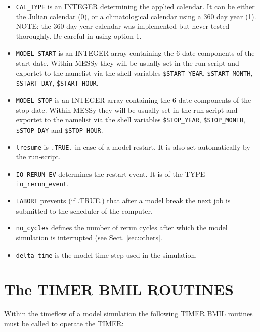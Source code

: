 \documentclass[twoside]{article}
\begin{document}
\begin{itemize}
\item \verb|CAL_TYPE| is an {\footnotesize INTEGER} determining the applied
      calendar.
      It can be either the Julian calendar (0), or a climatological calendar
      using a 360 day year (1). NOTE: the 360 day year calendar was implemented
      but never tested thoroughly. Be careful in using option 1. 
\item \verb|MODEL_START| is an {\footnotesize INTEGER} array containing the 6 date
      components of the start date. Within MESSy they will be usually set in
      the run-script and exportet to the namelist via the shell variables
      \verb|$START_YEAR|, \verb|$START_MONTH|, \verb|$START_DAY|,
      \verb|$START_HOUR|.
\item \verb|MODEL_STOP| is an {\footnotesize INTEGER} array containing the 6 date
      components of the stop date. Within MESSy they will be usually set in
      the run-script and exportet to the namelist via the shell variables
      \verb|$STOP_YEAR|, \verb|$STOP_MONTH|, \verb|$STOP_DAY| and
      \verb|$STOP_HOUR|.
\item \verb|lresume| is \verb|.TRUE.| in case of a model restart. It is also
      set automatically by the run-script.
\item \verb|IO_RERUN_EV| determines the restart event. It
      is of the {\footnotesize TYPE} \verb|io_rerun_event|.
\item \verb|LABORT| prevents (if .TRUE.) that after a model break the next job
      is submitted to the scheduler of the computer.
\item \verb|no_cycles| defines the number of rerun cycles after which the model
      simulation is interrupted (see Sect. \ref{sec:others}.
\item \verb|delta_time| is the model time step used in the simulation.
\end{itemize}

\section{The TIMER BMIL ROUTINES}
\label{sec:BMIL}
Within the timeflow of a model simulation the following TIMER BMIL routines
must be called to operate the TIMER:
\end{document}
